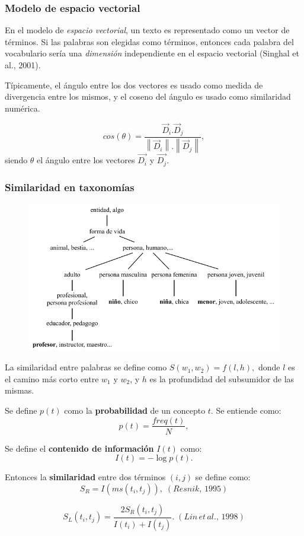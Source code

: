 \begin{frame}
	\frametitle{Modelo de espacio vectorial}
	En el modelo de \textit{espacio vectorial}, un texto es representado como un vector de términos. Si las palabras son elegidas como términos, entonces cada palabra del vocabulario sería una \textit{dimensión} independiente en el espacio vectorial (Singhal et al., 2001).

	\bigskip

	Típicamente, el ángulo entre los dos vectores es usado como medida de divergencia entre los mismos, y el coseno del ángulo es usado como similaridad numérica.

	\[cos(\theta) = \frac{\vec{D}_i.\vec{D}_j}{\left \| \vec{D}_i \right \|.\left \| \vec{D}_j \right \|},\]
	\bigskip
	siendo \(\theta\) el ángulo entre los vectores  \(\overrightarrow{D_i}\) y \(\overrightarrow{D_j}\).
\end{frame}

\begin{frame}[allowframebreaks]
	\frametitle{Similaridad en taxonomías}
		\begin{figure}
		\centering
		\includegraphics[width=0.7\linewidth]{../7_marco_teorico/imagenes/taxonomia_semantica}
		\label{fig:taxonomiasemantica}
	\end{figure}

	\begin{footnotesize}
		La similaridad entre palabras se define como \(S(w_1,w_2)=f(l,h),\)
		donde \(l\) es el camino más corto entre \(w_1\) y \(w_2\), y \(h\) es la profundidad del subsumidor de las mismas.
	\end{footnotesize}

	\framebreak

	Se define \(p(t)\) como la \textbf{probabilidad} de un concepto \(t\). Se entiende como:
	\[p(t)=\frac{freq(t)}{N},\]

	\bigskip

	Se define el \textbf{contenido de información} \(I(t)\) como:
	\[I(t)=-\log p(t).\]

	Entonces la \textbf{similaridad} entre dos términos \((i, j)\) se define como:
	\[S_R = I(ms(t_i,t_j)),\; (Resnik,\,1995)\]

	\[S_L(t_i, t_j)=\frac{2S_R(t_i,t_j)}{I(t_i)+I(t_j)}.\; (Lin\,et\,al.,\,1998)\]
\end{frame}

